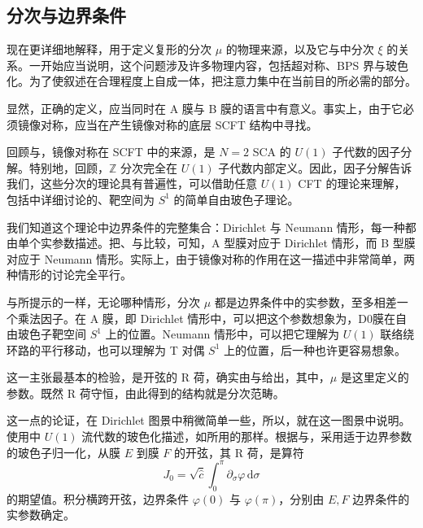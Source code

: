 \subsection{分次与边界条件}\label{sec:5.3.4}

现在更详细地解释，用于定义复形的分次 $\mu$ 的物理来源，以及它与中分次 $\xi$ 的关系。一开始应当说明，这个问题涉及许多物理内容，包括超对称、BPS 界与玻色化。为了使叙述在合理程度上自成一体，把注意力集中在当前目的所必需的部分。

显然，正确的定义，应当同时在 A 膜与 B 膜的语言中有意义。事实上，由于它必须镜像对称，应当在产生镜像对称的底层 SCFT 结构中寻找。

回顾与，镜像对称在 SCFT 中的来源，是 $N=2$ SCA 的 $U(1)$ 子代数的因子分解。特别地，回顾，$\mathbb{Z}$ 分次完全在 $U(1)$ 子代数内部定义。因此，因子分解告诉我们，这些分次的理论具有普遍性，可以借助任意 $U(1)$ CFT 的理论来理解，包括中详细讨论的、靶空间为 $S^1$ 的简单自由玻色子理论。

我们知道这个理论中边界条件的完整集合：Dirichlet 与 Neumann 情形，每一种都由单个实参数描述。把、与比较，可知，A 型膜对应于 Dirichlet 情形，而 B 型膜对应于 Neumann 情形。实际上，由于镜像对称的作用在这一描述中非常简单，两种情形的讨论完全平行。

与所提示的一样，无论哪种情形，分次 $\mu$ 都是边界条件中的实参数，至多相差一个乘法因子。在 A 膜，即 Dirichlet 情形中，可以把这个参数想象为，D0膜在自由玻色子靶空间 $S^1$ 上的位置。Neumann 情形中，可以把它理解为 $U(1)$ 联络绕环路的平行移动，也可以理解为 T 对偶 $S^1$ 上的位置，后一种也许更容易想象。

这一主张最基本的检验，是开弦的 R 荷，确实由与给出，其中，$\mu$ 是这里定义的参数。既然 R 荷守恒，由此得到的结构就是分次范畴。

这一点的论证，在 Dirichlet 图景中稍微简单一些，所以，就在这一图景中说明。使用中 $U(1)$ 流代数的玻色化描述，如所用的那样。根据与，采用适于边界参数的玻色子归一化，从膜 $E$ 到膜 $F$ 的开弦，其 R 荷，是算符
\[
J_0=\sqrt{\hat c}\int_0^\pi\partial_\sigma\varphi\,\mathrm{d}\sigma
\]
的期望值。积分横跨开弦，边界条件 $\varphi(0)$ 与 $\varphi(\pi)$，分别由 $E,F$ 边界条件的实参数确定。

